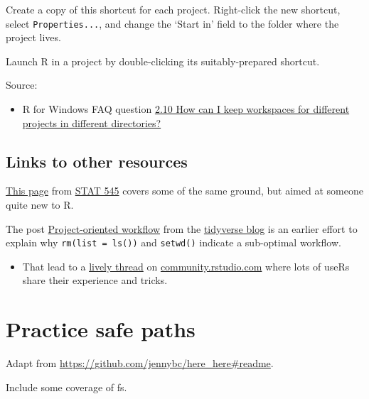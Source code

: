 \documentclass[
  letterpaper,
]{book}
\providecommand{\tightlist}{%
  \setlength{\itemsep}{0pt}\setlength{\parskip}{0pt}}\usepackage{longtable,booktabs,array}
\begin{document}
Create a copy of this shortcut for each project. Right-click the new
shortcut, select \texttt{Properties...}, and change the `Start in' field
to the folder where the project lives.

Launch R in a project by double-clicking its suitably-prepared shortcut.

Source:

\begin{itemize}
\tightlist
\item
  R for Windows FAQ question
  \href{https://cran.r-project.org/bin/windows/base/rw-FAQ.html\#How-can-I-keep-workspaces-for-different-projects-in-different-directories_003f}{2.10
  How can I keep workspaces for different projects in different
  directories?}
\end{itemize}

\hypertarget{links-to-other-resources-1}{%
\section{Links to other resources}\label{links-to-other-resources-1}}

\href{http://stat545.com/block002_hello-r-workspace-wd-project.html}{This
page} from \href{http://stat545.com/topics.html}{STAT 545} covers some
of the same ground, but aimed at someone quite new to R.

The post
\href{https://www.tidyverse.org/articles/2017/12/workflow-vs-script/}{Project-oriented
workflow} from the \href{https://www.tidyverse.org/articles/}{tidyverse
blog} is an earlier effort to explain why \texttt{rm(list\ =\ ls())} and
\texttt{setwd()} indicate a sub-optimal workflow.

\begin{itemize}
\tightlist
\item
  That lead to a
  \href{https://community.rstudio.com/t/project-oriented-workflow-setwd-rm-list-ls-and-computer-fires/3549/2}{lively
  thread} on \href{https://community.rstudio.com}{community.rstudio.com}
  where lots of useRs share their experience and tricks.
\end{itemize}

\hypertarget{safe-paths}{%
\chapter{Practice safe paths}\label{safe-paths}}

Adapt from \url{https://github.com/jennybc/here_here\#readme}.

Include some coverage of fs.
\end{document}
